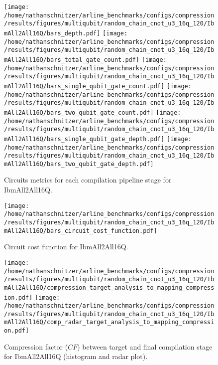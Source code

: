 \documentclass{report}%
\begin{document}
\begin{figure}[h!]%
\centering%
\texttt{[image: /home/nathanschnitzer/arline\_benchmarks/configs/compression/results/figures/multiqubit/random\_chain\_cnot\_u3\_16q\_120/IbmAll2All16Q/bars\_depth.pdf]}%
\centering%
\texttt{[image: /home/nathanschnitzer/arline\_benchmarks/configs/compression/results/figures/multiqubit/random\_chain\_cnot\_u3\_16q\_120/IbmAll2All16Q/bars\_total\_gate\_count.pdf]}%
\linebreak%
\centering%
\texttt{[image: /home/nathanschnitzer/arline\_benchmarks/configs/compression/results/figures/multiqubit/random\_chain\_cnot\_u3\_16q\_120/IbmAll2All16Q/bars\_single\_qubit\_gate\_count.pdf]}%
\centering%
\texttt{[image: /home/nathanschnitzer/arline\_benchmarks/configs/compression/results/figures/multiqubit/random\_chain\_cnot\_u3\_16q\_120/IbmAll2All16Q/bars\_two\_qubit\_gate\_count.pdf]}%
\linebreak%
\centering%
\texttt{[image: /home/nathanschnitzer/arline\_benchmarks/configs/compression/results/figures/multiqubit/random\_chain\_cnot\_u3\_16q\_120/IbmAll2All16Q/bars\_single\_qubit\_gate\_depth.pdf]}%
\centering%
\texttt{[image: /home/nathanschnitzer/arline\_benchmarks/configs/compression/results/figures/multiqubit/random\_chain\_cnot\_u3\_16q\_120/IbmAll2All16Q/bars\_two\_qubit\_gate\_depth.pdf]}%
\linebreak%
\caption{Circuits metrics for each compilation pipeline stage for IbmAll2All16Q.}%
\end{figure}

%


\begin{figure}[h!]%
\centering%
\texttt{[image: /home/nathanschnitzer/arline\_benchmarks/configs/compression/results/figures/multiqubit/random\_chain\_cnot\_u3\_16q\_120/IbmAll2All16Q/bars\_circuit\_cost\_function.pdf]}%
\caption{Circuit cost function for IbmAll2All16Q.}%
\end{figure}

%


\begin{figure}[h!]%
\centering%
\texttt{[image: /home/nathanschnitzer/arline\_benchmarks/configs/compression/results/figures/multiqubit/random\_chain\_cnot\_u3\_16q\_120/IbmAll2All16Q/compression\_target\_analysis\_to\_mapping\_compression.pdf]}%
\centering%
\texttt{[image: /home/nathanschnitzer/arline\_benchmarks/configs/compression/results/figures/multiqubit/random\_chain\_cnot\_u3\_16q\_120/IbmAll2All16Q/comp\_radar\_target\_analysis\_to\_mapping\_compression.pdf]}%
\caption{Compression factor ($CF$) between target and final compilation stage for IbmAll2All16Q
                        (histogram and radar plot).
                        }%
\end{figure}
\end{document}
